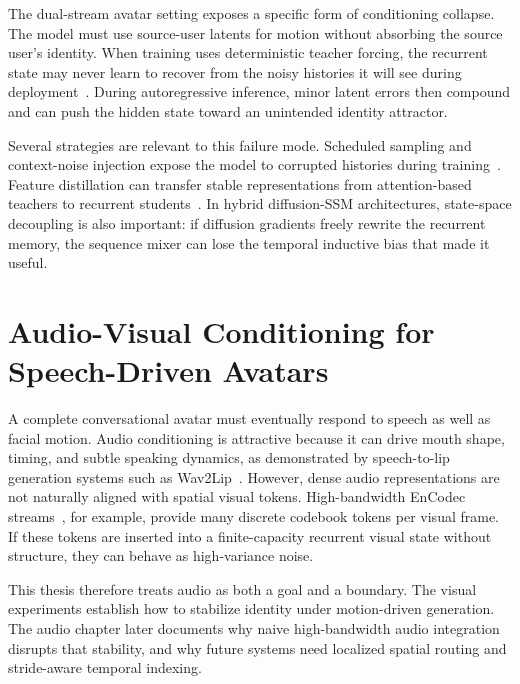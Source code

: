 \documentclass[12pt,letterpaper]{report}
\begin{document}
The dual-stream avatar setting exposes a specific form of conditioning collapse. The model must use source-user latents for motion without absorbing the source user's identity. When training uses deterministic teacher forcing, the recurrent state may never learn to recover from the noisy histories it will see during deployment~\cite{t2md2025, statespacediffuser2025}. During autoregressive inference, minor latent errors then compound and can push the hidden state toward an unintended identity attractor.

Several strategies are relevant to this failure mode. Scheduled sampling and context-noise injection expose the model to corrupted histories during training~\cite{bengio2015scheduled}. Feature distillation can transfer stable representations from attention-based teachers to recurrent students~\cite{phung2024dimsum, t2md2025}. In hybrid diffusion-SSM architectures, state-space decoupling is also important: if diffusion gradients freely rewrite the recurrent memory, the sequence mixer can lose the temporal inductive bias that made it useful.

\section{Audio-Visual Conditioning for Speech-Driven Avatars}

A complete conversational avatar must eventually respond to speech as well as facial motion. Audio conditioning is attractive because it can drive mouth shape, timing, and subtle speaking dynamics, as demonstrated by speech-to-lip generation systems such as Wav2Lip~\cite{prajwal2020wav2lip}. However, dense audio representations are not naturally aligned with spatial visual tokens. High-bandwidth EnCodec streams~\cite{defossez2023high}, for example, provide many discrete codebook tokens per visual frame. If these tokens are inserted into a finite-capacity recurrent visual state without structure, they can behave as high-variance noise.

This thesis therefore treats audio as both a goal and a boundary. The visual experiments establish how to stabilize identity under motion-driven generation. The audio chapter later documents why naive high-bandwidth audio integration disrupts that stability, and why future systems need localized spatial routing and stride-aware temporal indexing.

\end{document}
